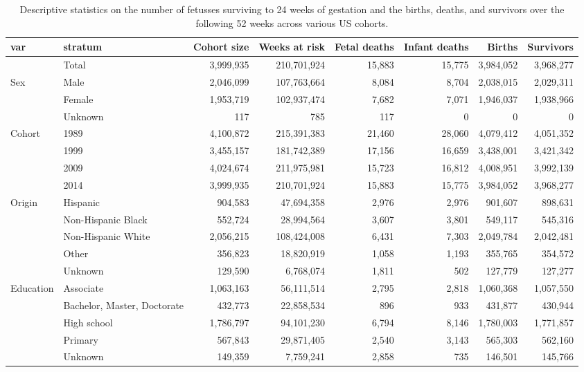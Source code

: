 \begin{table}[t]
\caption*{
{\fontsize{20}{25}\selectfont  Descriptive statistics on the number of fetusses surviving to 24 weeks of gestation and the births, deaths, and survivors over the following 52 weeks across various US cohorts.\fontsize{12}{15}\selectfont }
} 
\fontsize{12.0pt}{14.0pt}\selectfont
\begin{tabular*}{\linewidth}{@{\extracolsep{\fill}}llrrrrrr}
\toprule
var & stratum & Cohort size & Weeks at risk & Fetal deaths & Infant deaths & Births & Survivors \\ 
\midrule\addlinespace[2.5pt]
  & Total & 3,999,935 & 210,701,924 & 15,883 & 15,775 & 3,984,052 & 3,968,277 \\ 
Sex & Male & 2,046,099 & 107,763,664 & 8,084 & 8,704 & 2,038,015 & 2,029,311 \\ 
 & Female & 1,953,719 & 102,937,474 & 7,682 & 7,071 & 1,946,037 & 1,938,966 \\ 
 & Unknown & 117 & 785 & 117 & 0 & 0 & 0 \\ 
Cohort & 1989 & 4,100,872 & 215,391,383 & 21,460 & 28,060 & 4,079,412 & 4,051,352 \\ 
 & 1999 & 3,455,157 & 181,742,389 & 17,156 & 16,659 & 3,438,001 & 3,421,342 \\ 
 & 2009 & 4,024,674 & 211,975,981 & 15,723 & 16,812 & 4,008,951 & 3,992,139 \\ 
 & 2014 & 3,999,935 & 210,701,924 & 15,883 & 15,775 & 3,984,052 & 3,968,277 \\ 
Origin & Hispanic & 904,583 & 47,694,358 & 2,976 & 2,976 & 901,607 & 898,631 \\ 
 & Non-Hispanic Black & 552,724 & 28,994,564 & 3,607 & 3,801 & 549,117 & 545,316 \\ 
 & Non-Hispanic White & 2,056,215 & 108,424,008 & 6,431 & 7,303 & 2,049,784 & 2,042,481 \\ 
 & Other & 356,823 & 18,820,919 & 1,058 & 1,193 & 355,765 & 354,572 \\ 
 & Unknown & 129,590 & 6,768,074 & 1,811 & 502 & 127,779 & 127,277 \\ 
Education & Associate & 1,063,163 & 56,111,514 & 2,795 & 2,818 & 1,060,368 & 1,057,550 \\ 
 & Bachelor, Master, Doctorate & 432,773 & 22,858,534 & 896 & 933 & 431,877 & 430,944 \\ 
 & High school & 1,786,797 & 94,101,230 & 6,794 & 8,146 & 1,780,003 & 1,771,857 \\ 
 & Primary & 567,843 & 29,871,405 & 2,540 & 3,143 & 565,303 & 562,160 \\ 
 & Unknown & 149,359 & 7,759,241 & 2,858 & 735 & 146,501 & 145,766 \\ 
\bottomrule
\end{tabular*}
\end{table}

